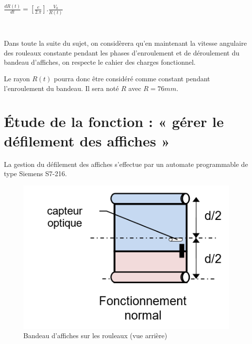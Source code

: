 \begin{center}
$\frac{dR(t)}{dt}=\left[\frac{e}{2.\pi}\right].\frac{V_0}{R(t)}$
\end{center}





~\

Dans toute la suite du sujet, on considèrera qu'en maintenant la vitesse angulaire des rouleaux constante pendant les phases d'enroulement et de déroulement du bandeau d'affiches, on respecte le cahier des charges fonctionnel.

Le rayon $R(t)$ pourra donc être considéré comme constant pendant l'enroulement du bandeau. Il sera noté $R$ avec $R=76 mm$.

\section{Étude de la fonction : « gérer le défilement des affiches »}

La gestion du défilement des affiches s'effectue par un automate programmable de type Siemens S7-216. 

\begin{figure}
  \includegraphics[width=0.9\linewidth]{img/fig06}
  \caption{Bandeau d'affiches sur les rouleaux (vue arrière)}
  \label{fig06}
\end{figure}

